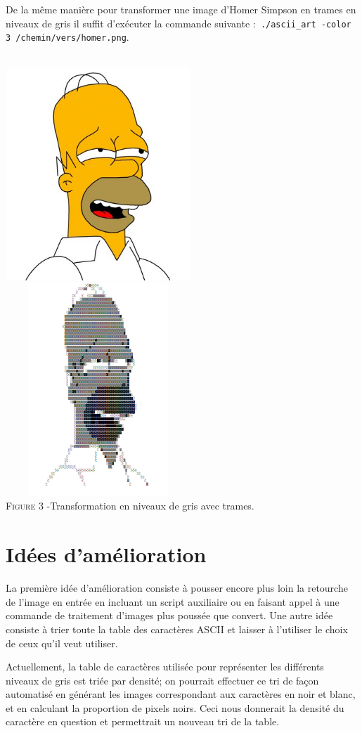 \documentclass{article}
\begin{document}
De la même manière pour transformer une image d'Homer Simpson en trames en niveaux de gris il suffit d'exécuter la commande suivante :\verb# ./ascii_art -color 3 /chemin/vers/homer.png#. \\\\
\begin{center}
\centering
\includegraphics[width=7cm,height=8cm]{homer.jpg}
\includegraphics[width=7cm,height=8cm]{homeroutputed.png}
\\ \textsc{Figure 3 -}Transformation en niveaux de gris avec trames.
\end{center}
\section{Idées d'amélioration}
La première idée d'amélioration consiste à pousser encore plus loin la retourche de l'image en entrée en incluant un script auxiliaire ou en faisant appel à une commande de traitement d'images plus poussée que convert. Une autre idée consiste à trier toute la table des caractères ASCII et laisser à l'utiliser le choix de ceux qu'il veut utiliser. 
\newline

Actuellement, la table de caractères utilisée pour représenter les différents niveaux de gris est triée par densité; on pourrait effectuer ce tri de façon automatisé en générant les images correspondant aux caractères en noir et blanc, et en calculant la proportion de pixels noirs. Ceci nous donnerait la densité du caractère en question et permettrait un nouveau tri de la table. 
\end{document}
